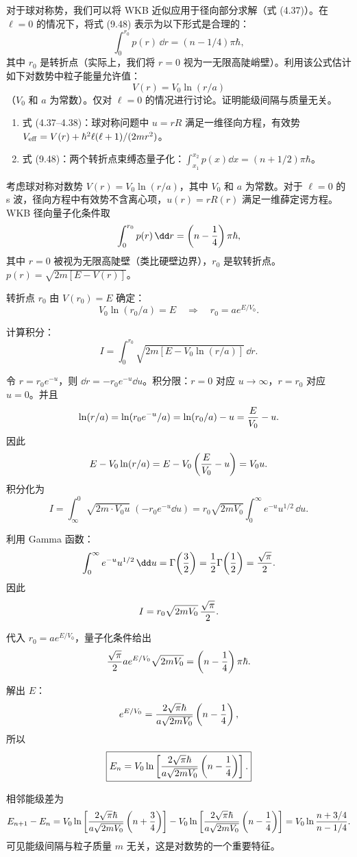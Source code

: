 \begin{question}
对于球对称势，我们可以将 WKB 近似应用于径向部分求解（式 (4.37)）。在 $\ell=0$ 的情况下，将式 (9.48) 表示为以下形式是合理的：
\[
\int_0^{r_0}p(r)\,\dd r=(n-1/4)\pi\hbar,
\]
其中 $r_0$ 是转折点（实际上，我们将 $r=0$ 视为一无限高陡峭壁）。利用该公式估计如下对数势中粒子能量允许值：
\[
V(r)=V_0\ln(r/a)
\]
（$V_0$ 和 $a$ 为常数）。仅对 $\ell=0$ 的情况进行讨论。证明能级间隔与质量无关。

\par\smallskip
{}
\begin{enumerate}[leftmargin=2.2em,itemsep=0.12em,topsep=0.12em,parsep=0pt]
\item 式 (4.37--4.38)：球对称问题中 $u=rR$ 满足一维径向方程，有效势 $V_{\rm eff}=V(r)+\hbar^2\ell(\ell+1)/(2mr^2)$。
\item 式 (9.48)：两个转折点束缚态量子化：$\int_{x_1}^{x_2}p(x)\dd x=(n+1/2)\pi\hbar$。
\end{enumerate}

\end{question}
\begin{solution}
考虑球对称对数势 $V(r)=V_0\ln(r/a)$，其中 $V_0$ 和 $a$ 为常数。对于 $\ell=0$ 的 s 波，径向方程中有效势不含离心项，$u(r)=rR(r)$ 满足一维薛定谔方程。WKB 径向量子化条件取
\[
\int_0^{r_0}p(r)\,\dd r=\left(n-{1\over4}\right)\pi\hbar,
\]
其中 $r=0$ 被视为无限高陡壁（类比硬壁边界），$r_0$ 是软转折点。$p(r)=\sqrt{2m[E-V(r)]}$。

转折点 $r_0$ 由 $V(r_0)=E$ 确定：
\[
V_0\ln(r_0/a)=E\quad\Longrightarrow\quad r_0=a e^{E/V_0}.
\]

计算积分：
\[
I=\int_0^{r_0}\sqrt{2m\left[E-V_0\ln(r/a)\right]}\,\dd r.
\]

令 $r=r_0e^{-u}$，则 $\dd r=-r_0e^{-u}\dd u$。积分限：$r=0$ 对应 $u\to\infty$，$r=r_0$ 对应 $u=0$。并且
\[
\ln(r/a)=\ln(r_0e^{-u}/a)=\ln(r_0/a)-u={E\over V_0}-u.
\]
因此
\[
E-V_0\ln(r/a)=E-V_0\left({E\over V_0}-u\right)=V_0u.
\]
积分化为
\[
I=\int_\infty^0\sqrt{2m\cdot V_0u}\;(-r_0e^{-u}\dd u)
=r_0\sqrt{2mV_0}\int_0^\infty e^{-u}u^{1/2}\,\dd u.
\]

利用 Gamma 函数：
\[
\int_0^\infty e^{-u}u^{1/2}\,\dd u=\Gamma\!\left({3\over2}\right)
={1\over2}\Gamma\!\left({1\over2}\right)={\sqrt\pi\over2}.
\]
因此
\[
I=r_0\sqrt{2mV_0}\,{\sqrt\pi\over2}.
\]

代入 $r_0=a e^{E/V_0}$，量子化条件给出
\[
{\sqrt\pi\over2}a e^{E/V_0}\sqrt{2mV_0}=\left(n-{1\over4}\right)\pi\hbar.
\]

解出 $E$：
\[
e^{E/V_0}={2\sqrt\pi\hbar\over a\sqrt{2mV_0}}\left(n-{1\over4}\right),
\]
所以
\[
\boxed{E_n=V_0\ln\left[{2\sqrt\pi\hbar\over a\sqrt{2mV_0}}
\left(n-{1\over4}\right)\right].}
\]

相邻能级差为
\[
E_{n+1}-E_n
=V_0\ln\left[{2\sqrt\pi\hbar\over a\sqrt{2mV_0}}\left(n+{3\over4}\right)\right]
-V_0\ln\left[{2\sqrt\pi\hbar\over a\sqrt{2mV_0}}\left(n-{1\over4}\right)\right]
=V_0\ln{n+3/4\over n-1/4}.
\]
可见能级间隔与粒子质量 $m$ 无关，这是对数势的一个重要特征。
\end{solution}

